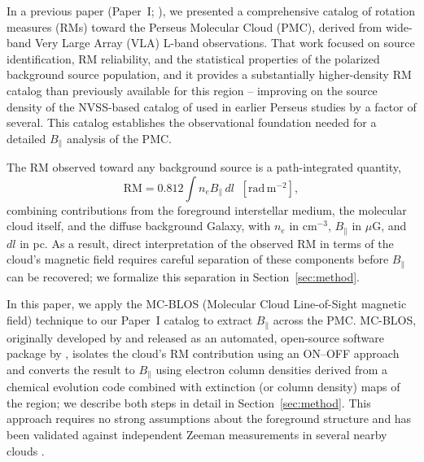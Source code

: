 \documentclass[twocolumn]{aastex631}
\begin{document}
In a previous paper (Paper~I; \citealt{hajizadeh2026comprehensive}), we presented a comprehensive catalog of rotation measures (RMs) toward the Perseus Molecular Cloud (PMC), derived from wide-band Very Large Array (VLA) L-band observations. That work focused on source identification, RM reliability, and the statistical properties of the polarized background source population, and it provides a substantially higher-density RM catalog than previously available for this region -- improving on the source density of the NVSS-based catalog of \citet{taylor2009rotation} used in earlier Perseus studies by a factor of several. This catalog establishes the observational foundation needed for a detailed $B_\parallel$ analysis of the PMC.

The RM observed toward any background source is a path-integrated quantity,
\begin{equation}
\label{eq:rm-basic}
    \mathrm{RM} = 0.812 \int n_e B_\parallel \, dl \;\;[\mathrm{rad\,m^{-2}}],
\end{equation}
combining contributions from the foreground interstellar medium, the molecular cloud itself, and the diffuse background Galaxy, with $n_e$ in $\mathrm{cm^{-3}}$, $B_\parallel$ in $\mu$G, and $dl$ in pc. As a result, direct interpretation of the observed RM in terms of the cloud's magnetic field requires careful separation of these components before $B_\parallel$ can be recovered; we formalize this separation in Section~\ref{sec:method}.

In this paper, we apply the MC-BLOS (Molecular Cloud Line-of-Sight magnetic field) technique to our Paper~I catalog to extract $B_\parallel$ across the PMC. MC-BLOS, originally developed by \citet{tahani2018} and released as an automated, open-source software package by \citet{tahani2025mcblos}, isolates the cloud's RM contribution using an ON--OFF approach and converts the result to $B_\parallel$ using electron column densities derived from a chemical evolution code combined with extinction (or column density) maps of the region; we describe both steps in detail in Section~\ref{sec:method}. This approach requires no strong assumptions about the foreground structure and has been validated against independent Zeeman measurements in several nearby clouds \citep{tahani2018, tahani2025mcblos}.
\end{document}

